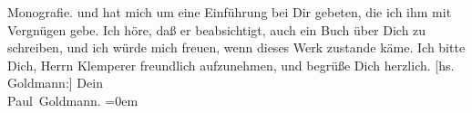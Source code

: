\begin{ledgroupsized}[t]{13cm}
{{{                  Monografie.}}}\label{K_L03470-1h} und hat mich um eine Einführung bei Dir gebeten, die ich ihm
               mit Vergnügen gebe. Ich höre, daß er beabsichtigt, auch ein Buch über Dich zu
               schreiben, und ich würde mich freuen, wenn dieses Werk zustande käme. Ich bitte Dich,
               Herrn Klemperer freundlich aufzunehmen, und
               begrüße Dich herzlich.\pend
           \pstart
           {[}hs. Goldmann:{]} Dein {\\[\baselineskip]}\spacefill\mbox{Paul Goldmann.}\pend
           \leftskip=0em{}
         
         \endnumbering{}\end{ledgroupsized}  \newcommand{\dateiname}{L03470}\newcommand{\titel}{Paul Goldmann an Arthur Schnitzler, 19. 4. 1910}\newcommand{\editorInnen}{Martin Anton Müller und Laura Untner}
      